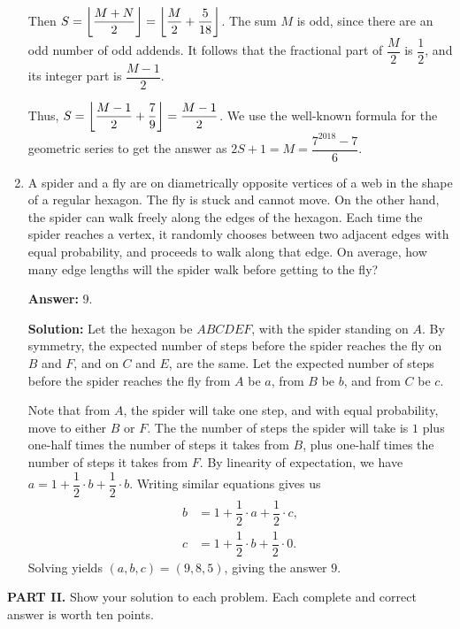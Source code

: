 \documentclass[11pt,paper=letter]{scrartcl}
\begin{document}
\begin{enumerate}[left=0pt]
Then $S = \left\lfloor \dfrac{M+N}2 \right\rfloor = \left\lfloor \dfrac M2 + \dfrac{5}{18} \right\rfloor$. The sum $M$ is odd, since there are an odd number of odd addends. It follows that the fractional part of $\dfrac M2$ is $\dfrac12$, and its integer part is $\dfrac{M-1}2$.

Thus, $S = \left\lfloor \dfrac{M-1}2 + \dfrac79 \right\rfloor = \dfrac{M-1}2$. We use the well-known formula for the geometric series to get the answer as $2S + 1 = M = \dfrac{7^{2018} - 7}6$.

\item A spider and a fly are on diametrically opposite vertices of a web in the shape of a regular hexagon. The fly is stuck and cannot move. On the other hand, the spider can walk freely along the edges of the hexagon. Each time the spider reaches a vertex, it randomly chooses between two adjacent edges with equal probability, and proceeds to walk along that edge. On average, how many edge lengths will the spider walk before getting to the fly?

\textbf{Answer:} $\boxed{9}$.

\textbf{Solution:} Let the hexagon be $ABCDEF$, with the spider standing on $A$. By symmetry, the expected number of steps before the spider reaches the fly on $B$ and $F$, and on $C$ and $E$, are the same. Let the expected number of steps before the spider reaches the fly from $A$ be $a$, from $B$ be $b$, and from $C$ be $c$.

Note that from $A$, the spider will take one step, and with equal probability, move to either $B$ or $F$. The the number of steps the spider will take is $1$ plus one-half times the number of steps it takes from $B$, plus one-half times the number of steps it takes from $F$. By linearity of expectation, we have $a = 1 + \dfrac12\cdot b + \dfrac12\cdot b$. Writing similar equations gives us \begin{align*}b &= 1 + \dfrac12\cdot a + \dfrac12\cdot c, \\ c &= 1 + \dfrac12\cdot b + \dfrac 12 \cdot 0. \end{align*} Solving yields $(a, b, c) = (9, 8, 5)$, giving the answer $9$.

\end{enumerate}

\noindent\textbf{PART II.} Show your solution to each problem. Each complete and correct answer is worth ten points.
\end{document}
